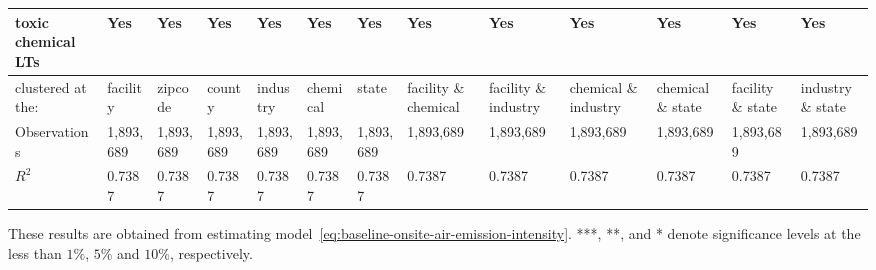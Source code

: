 \begin{table}[H]
{\begin{tabular}{@{}lllllllllllll@{}}
            toxic chemical LTs                  & Yes       & Yes       & Yes       & Yes       & Yes       & Yes       & Yes                  & Yes                  & Yes                  & Yes               & Yes               & Yes               \\\midrule
            clustered at the:                   & facility  & zipcode   & county    & industry  & chemical  & state     & facility \& chemical & facility \& industry & chemical \& industry & chemical \& state & facility \& state & industry \& state \\
            Observations                        & 1,893,689 & 1,893,689 & 1,893,689 & 1,893,689 & 1,893,689 & 1,893,689 & 1,893,689            & 1,893,689            & 1,893,689            & 1,893,689         & 1,893,689         & 1,893,689         \\
            $R^2$                               & 0.7387    & 0.7387    & 0.7387    & 0.7387    & 0.7387    & 0.7387    & 0.7387               & 0.7387               & 0.7387               & 0.7387            & 0.7387            & 0.7387            \\ \bottomrule\bottomrule
        \end{tabular}%
    }
    \begin{minipage}{18cm}
        \vspace{0.05in}
        These results are obtained from estimating model~\ref{eq:baseline-onsite-air-emission-intensity}. ***, **, and * denote significance levels at the less than $1\%$, $5\%$ and $10\%$, respectively.
    \end{minipage}
\end{table}